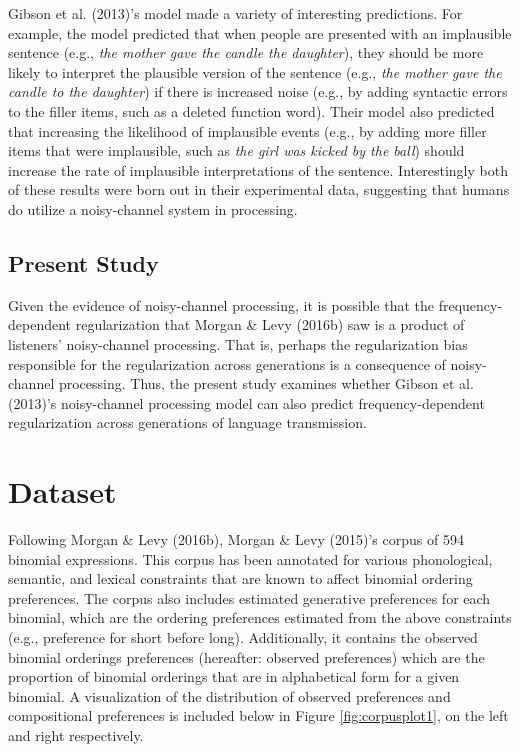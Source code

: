 \documentclass[10pt, letterpaper]{article}
\begin{document}
Gibson et al. (2013)'s model made a variety of interesting predictions.
For example, the model predicted that when people are presented with an
implausible sentence (e.g., \emph{the mother gave the candle the
daughter}), they should be more likely to interpret the plausible
version of the sentence (e.g., \emph{the mother gave the candle to the
daughter}) if there is increased noise (e.g., by adding syntactic errors
to the filler items, such as a deleted function word). Their model also
predicted that increasing the likelihood of implausible events (e.g., by
adding more filler items that were implausible, such as \emph{the girl
was kicked by the ball}) should increase the rate of implausible
interpretations of the sentence. Interestingly both of these results
were born out in their experimental data, suggesting that humans do
utilize a noisy-channel system in processing.

\hypertarget{present-study}{%
\subsection{Present Study}\label{present-study}}

Given the evidence of noisy-channel processing, it is possible that the
frequency-dependent regularization that Morgan \& Levy (2016b) saw is a
product of listeners' noisy-channel processing. That is, perhaps the
regularization bias responsible for the regularization across
generations is a consequence of noisy-channel processing. Thus, the
present study examines whether Gibson et al. (2013)'s noisy-channel
processing model can also predict frequency-dependent regularization
across generations of language transmission.

\hypertarget{dataset}{%
\section{Dataset}\label{dataset}}

Following Morgan \& Levy (2016b), Morgan \& Levy (2015)'s corpus of 594
binomial expressions. This corpus has been annotated for various
phonological, semantic, and lexical constraints that are known to affect
binomial ordering preferences. The corpus also includes estimated
generative preferences for each binomial, which are the ordering
preferences estimated from the above constraints (e.g., preference for
short before long). Additionally, it contains the observed binomial
orderings preferences (hereafter: observed preferences) which are the
proportion of binomial orderings that are in alphabetical form for a
given binomial. A visualization of the distribution of observed
preferences and compositional preferences is included below in Figure
\ref{fig:corpusplot1}, on the left and right respectively.
\end{document}
